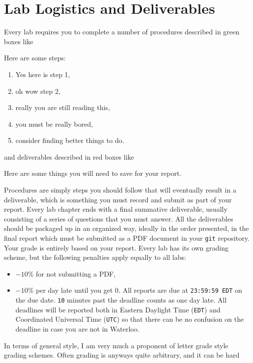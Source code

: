 \section{Lab Logistics and Deliverables}\label{intro:logistics}
Every lab requires you to complete a number of procedures described in
green boxes like
\begin{procedure}[]
  Here are some steps:
  \begin{enumerate}[label=(\arabic*)]
    \item{Yes here is step 1,}
    \item{oh wow step 2,}
    \item{really you are still reading this,}
    \item{you must be really bored,}
    \item{consider finding better things to do.}
  \end{enumerate}
\end{procedure}
\noindent
and deliverables described in red boxes like
\begin{deliverable}[]
  Here are some things you will need to save for your report.
\end{deliverable}
Procedures are simply steps you should follow that will eventually result in
a deliverable, which is something you must record and submit as part of your
report. Every lab chapter ends with a final summative deliverable, usually
consisting of a series of questions that you must answer.
%
All the deliverables should be packaged up in an organized way, ideally
in the order presented, in the final report which must be submitted as
a PDF document in your \texttt{git} repository. Your grade is entirely based
on your report. Every lab has its own grading scheme, but the following
penalties apply equally to all labs:
\begin{itemize}
  \item{
    \(-10\%\) for not submitting a PDF,
  }
  \item{
    \(-10\%\) per day late until you get \(0.\) All reports are due
    at \texttt{23:59:59 EDT} on the due date.
    \texttt{10} minutes past the
    deadline counts as one day late. All deadlines will be reported both
    in Eastern Daylight Time (\texttt{EDT}) and Coordinated Universal Time
    (\texttt{UTC})
    so that there can be no confusion on the deadline in case you are not
    in Waterloo.
  }
\end{itemize}
%
In terms of general style, I am very much a proponent of letter grade style
grading schemes. Often grading is anyways quite arbitrary, and it can be hard
